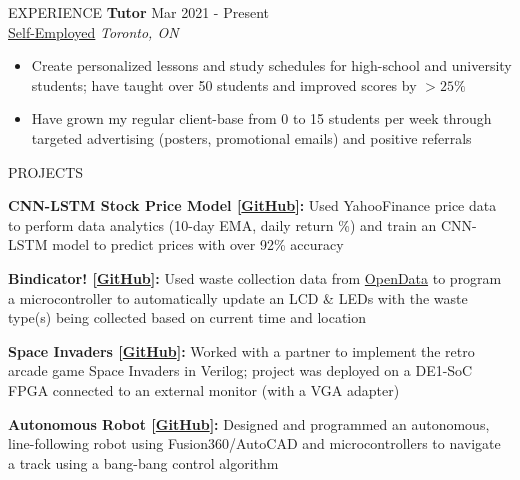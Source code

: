 \documentclass{resume}
\begin{document}
\begin{rSection}{EXPERIENCE}
\textbf{Tutor} \hfill Mar 2021 - Present \\
\href{https://www.overleaf.com/read/qybvrsfbsbwq}{Self-Employed} \hfill \textit{Toronto, ON} 
\vspace{-0.2cm}
\begin{itemize}
   \itemsep -8pt {} 
   \item Create personalized lessons and study schedules for high-school and university students; have taught over 50 students and improved scores by $ >25\%$ 
   \item Have grown my regular client-base from 0 to 15 students per week through targeted advertising (posters, promotional emails) and positive referrals
\end{itemize}
\end{rSection} 


\begin{rSection}{PROJECTS}
\vspace{-1.25em}
\item \textbf{CNN-LSTM Stock Price Model [\href{https://github.com/endothermiic/stock-predictor}{GitHub}]:} Used YahooFinance price data to perform data analytics (10-day EMA, daily return \%) and train an CNN-LSTM model to predict prices with over 92\% accuracy   
\item \textbf{Bindicator! [\href{https://github.com/endothermiic/bindicator}{GitHub}]:} Used waste collection data from \href{https://open.toronto.ca/dataset/solid-waste-pickup-schedule/}{OpenData} to program a microcontroller to automatically update an LCD \& LEDs with the waste type(s) being collected based on current time and location
\item \textbf{Space Invaders [\href{https://github.com/endothermiic/space-invaders}{GitHub}]:} {Worked with a partner to implement the retro arcade game Space Invaders in Verilog; project was deployed on a DE1-SoC FPGA connected to an external monitor (with a VGA adapter)}
\item \textbf{Autonomous Robot [\href{https://github.com/endothermiic/robot}{GitHub}]:} {Designed and programmed an autonomous, line-following robot using Fusion360/AutoCAD and microcontrollers to navigate a track using a bang-bang control algorithm}
 \end{rSection} 
\end{document}
